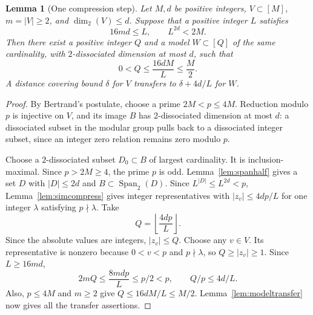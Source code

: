 \documentclass[12pt,leqno]{article}
\numberwithin{equation}{section}
\newtheorem{lemma}[theorem]{Lemma}
\theoremstyle{remark}
\newcommand{\LRdimension}{\operatorname{dim}_2}
\begin{document}
\begin{lemma}[One compression step]\label{lem:compressstep}
Let $M,d$ be positive integers, $V\subset[M]$, $m=|V|\ge2$, and $\LRdimension(V)\le d$. Suppose that a positive integer $L$ satisfies
\[
16md\le L,\qquad L^{2d}<2M.
\]
Then there exist a positive integer $Q$ and a model $W\subset[Q]$ of the same cardinality, with $2$-dissociated dimension at most $d$, such that
\[
0<Q\le\frac{16dM}{L}\le\frac M2.
\]
A distance covering bound $\delta$ for $V$ transfers to $\delta+4d/L$ for $W$.
\end{lemma}
\begin{proof}
By Bertrand's postulate, choose a prime $2M<p\le4M$. Reduction modulo $p$ is injective on $V$, and its image $B$ has $2$-dissociated dimension at most $d$: a dissociated subset in the modular group pulls back to a dissociated integer subset, since an integer zero relation remains zero modulo $p$.

Choose a $2$-dissociated subset $D_0\subset B$ of largest cardinality. It is inclusion-maximal. Since $p>2M\ge4$, the prime $p$ is odd. Lemma~\ref{lem:spanhalf} gives a set $D$ with $|D|\le2d$ and $B\subset\operatorname{Span}_2(D)$. Since $L^{|D|}\le L^{2d}<p$, Lemma~\ref{lem:simcompress} gives integer representatives with $|z_v|\le4dp/L$ for one integer $\lambda$ satisfying $p\nmid\lambda$. Take
\[
Q=\left\lfloor\frac{4dp}{L}\right\rfloor.
\]
Since the absolute values are integers, $|z_v|\le Q$. Choose any $v\in V$. Its representative is nonzero because $0<v<p$ and $p\nmid\lambda$, so $Q\ge|z_v|\ge1$. Since $L\ge16md$,
\[
2mQ\le\frac{8mdp}{L}\le p/2<p,
\qquad Q/p\le4d/L.
\]
Also, $p\le4M$ and $m\ge2$ give $Q\le16dM/L\le M/2$. Lemma~\ref{lem:modeltransfer} now gives all the transfer assertions.
\end{proof}
\end{document}
